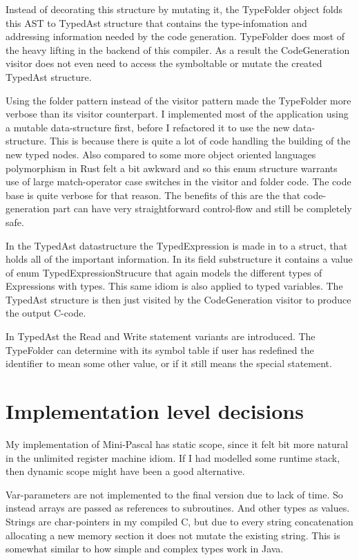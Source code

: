 \documentclass[12pt,a4paper]{article}
\begin{document}
Instead of decorating this structure by mutating it, the TypeFolder object
folds this AST to TypedAst structure that contains the type-infomation and
addressing information needed by the code generation. TypeFolder does most of
the heavy lifting in the backend of this compiler.  As a result the
CodeGeneration visitor does not even need to access the symboltable or mutate
the created TypedAst structure.

Using the folder pattern instead of the visitor pattern made the TypeFolder
more verbose than its visitor counterpart. I implemented most of the
application using a mutable data-structure first, before I refactored it to use
the new data-structure. This is because there is quite a lot of code handling
the building of the new typed nodes. Also compared to some more object oriented
languages polymorphism in Rust felt a bit awkward and so this enum structure
warrants use of large match-operator case switches in the visitor and folder
code. The code base is quite verbose for that reason. The benefits of this are
the that code-generation part can have very straightforward control-flow and
still be completely safe.

In the TypedAst datastructure the TypedExpression is made in to a struct,
that holds all of the important information. In its field
substructure it contains a value of enum TypedExpressionStrucure that
again models the different types of Expressions with types.
This same idiom is also applied to typed variables. The TypedAst structure is
then just visited by the CodeGeneration visitor to produce the output
C-code.

In TypedAst the Read and Write statement variants are introduced.
The TypeFolder can determine with its symbol table if user
has redefined the identifier to mean some other value, or
if it still means the special statement.

\section{Implementation level decisions}

My implementation of Mini-Pascal has static scope, since it felt bit more
natural in the unlimited register machine idiom.  If I had  modelled some
runtime stack, then dynamic scope might have been a good alternative.

Var-parameters are not implemented to the final version due to lack of time.
So instead arrays are passed as references to subroutines.  And other types as
values. Strings are char-pointers in my compiled C, but due to every string
concatenation allocating a new memory section it does not mutate the existing
string. This is somewhat similar to how simple and
complex types work in Java.
\end{document}
